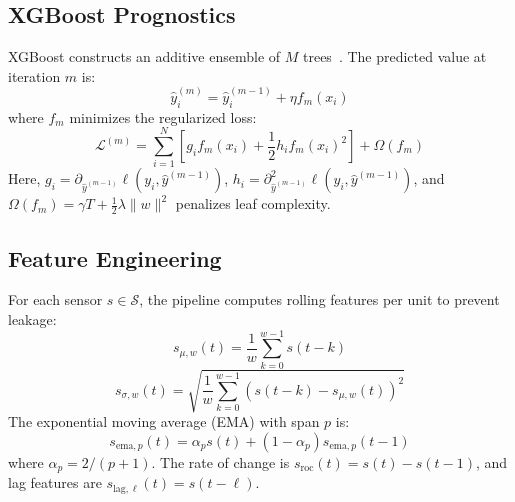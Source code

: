 \documentclass[letterpaper, 10 pt, conference]{ieeeconf}
\begin{document}
\subsection{XGBoost Prognostics}
XGBoost constructs an additive ensemble of $M$ trees~\cite{chen2016xgboost}. The predicted value at iteration $m$ is:
\begin{equation}
  \hat{y}_i^{(m)} = \hat{y}_i^{(m-1)} + \eta f_m(x_i)
\end{equation}
where $f_m$ minimizes the regularized loss:
\begin{equation}
  \mathcal{L}^{(m)} = \sum_{i=1}^N \left[ g_i f_m(x_i) + \frac{1}{2} h_i f_m(x_i)^2 \right] + \Omega(f_m)
\end{equation}
Here, $g_i = \partial_{\hat{y}^{(m-1)}} \ell(y_i, \hat{y}^{(m-1)})$, $h_i = \partial^2_{\hat{y}^{(m-1)}} \ell(y_i, \hat{y}^{(m-1)})$, and $\Omega(f_m) = \gamma T + \frac{1}{2}\lambda \|w\|^2$ penalizes leaf complexity.

\subsection{Feature Engineering}
For each sensor $s \in \mathcal{S}$, the pipeline computes rolling features per unit to prevent leakage:
\begin{equation}
  s_{\mu,w}(t) = \frac{1}{w}\sum_{k=0}^{w-1} s(t-k)
\end{equation}
\begin{equation}
  s_{\sigma,w}(t) = \sqrt{\frac{1}{w}\sum_{k=0}^{w-1} \left(s(t-k) - s_{\mu,w}(t)\right)^2}
\end{equation}
The exponential moving average (EMA) with span $p$ is:
\begin{equation}
  s_{\text{ema},p}(t) = \alpha_p s(t) + (1-\alpha_p) s_{\text{ema},p}(t-1)
\end{equation}
where $\alpha_p = 2 / (p+1)$. The rate of change is $s_{\text{roc}}(t) = s(t) - s(t-1)$, and lag features are $s_{\text{lag},\ell}(t) = s(t-\ell)$.
\end{document}
